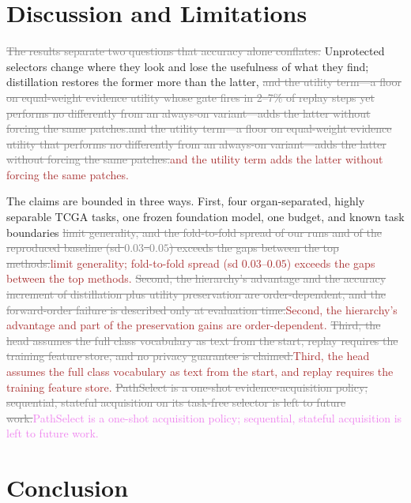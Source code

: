 \documentclass{article}
\newif\ifmarkup \markuptrue
\newcommand{\repc}[3]{\ifmarkup\textcolor{gray}{\sout{#2}}\textcolor{#1}{#3}\else#3\fi}
\newcommand{\repP}[2]{\repc{violet}{#1}{#2}}  %
\newcommand{\repB}[2]{\repc{brown}{#1}{#2}}   %
\newcommand{\delB}[1]{\ifmarkup\textcolor{gray}{\sout{#1}}\fi}
\begin{document}
\FloatBarrier
\section{Discussion and Limitations}
\label{sec:discussion}

\delB{The results separate two questions that accuracy alone conflates. }Unprotected selectors change where they look and lose the usefulness of what they find; distillation restores the former more than the latter, \repP{and the utility term---a floor on equal-weight evidence utility whose gate fires in 2--7\% of replay steps yet performs no differently from an always-on variant---adds the latter without forcing the same patches.}{\repB{and the utility term---a floor on equal-weight evidence utility that performs no differently from an always-on variant---adds the latter without forcing the same patches.}{and the utility term adds the latter without forcing the same patches.}}

The claims are bounded in three ways. First, four organ-separated, highly separable TCGA tasks, one frozen foundation model, one budget, and known task boundaries \repB{limit generality, and the fold-to-fold spread of our runs and of the reproduced baseline (sd $0.03$--$0.05$) exceeds the gaps between the top methods.}{limit generality; fold-to-fold spread (sd $0.03$--$0.05$) exceeds the gaps between the top methods.} \repB{Second, the hierarchy's advantage and the accuracy increment of distillation plus utility preservation are order-dependent, and the forward-order failure is described only at evaluation time.}{Second, the hierarchy's advantage and part of the preservation gains are order-dependent.} \repB{Third, the head assumes the full class vocabulary as text from the start, replay requires the training feature store, and no privacy guarantee is claimed.}{Third, the head assumes the full class vocabulary as text from the start, and replay requires the training feature store.} \repP{PathSelect is a one-shot evidence-acquisition policy; sequential, stateful acquisition on its task-free selector is left to future work.}{PathSelect is a one-shot acquisition policy; sequential, stateful acquisition is left to future work.}

\section{Conclusion}
\end{document}
